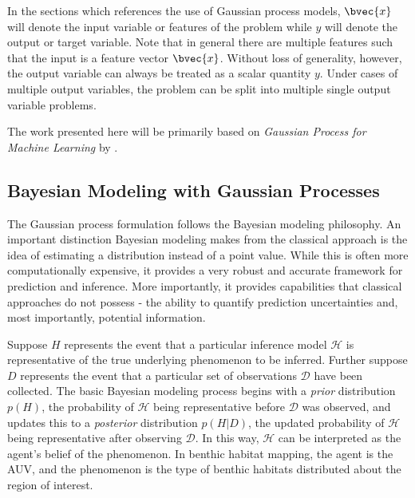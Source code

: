 		In the sections which references the use of Gaussian process models, $\bvec{x}$ will denote the input variable or features of the problem while $y$ will denote the output or target variable. Note that in general there are multiple features such that the input is a feature vector $\bvec{x}$. Without loss of generality, however, the output variable can always be treated as a scalar quantity $y$. Under cases of multiple output variables, the problem can be split into multiple single output variable problems.
		
		

		The work presented here will be primarily based on \textit{Gaussian Process for Machine Learning} by \cite{GaussianProcessForMachineLearning}. 

		\subsection{Bayesian Modeling with Gaussian Processes}
		\label{Background:GaussianProcesses:BayesianModeling}
		
			The Gaussian process formulation follows the Bayesian modeling philosophy. An important distinction Bayesian modeling makes from the classical approach is the idea of estimating a distribution instead of a point value. While this is often more computationally expensive, it provides a very robust and accurate framework for prediction and inference. More importantly, it provides capabilities that classical approaches do not possess - the ability to quantify prediction uncertainties and, most importantly, potential information. 
			
			Suppose $H$ represents the event that a particular inference model $\mathcal{H}$ is representative of the true underlying phenomenon to be inferred. Further suppose $D$ represents the event that a particular set of observations $\mathcal{D}$ have been collected. The basic Bayesian modeling process begins with a \textit{prior} distribution $p(H)$, the probability of $\mathcal{H}$ being representative before $\mathcal{D}$ was observed, and updates this to a \textit{posterior} distribution $p(H | D)$, the updated probability of $\mathcal{H}$ being representative after observing $\mathcal{D}$. In this way, $\mathcal{H}$ can be interpreted as the agent's belief of the phenomenon. In benthic habitat mapping, the agent is the AUV, and the phenomenon is the type of benthic habitats distributed about the region of interest.
			
